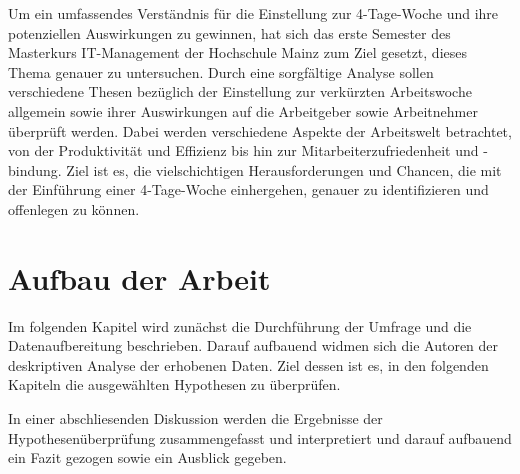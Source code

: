 Um ein umfassendes Verständnis für die Einstellung zur 4-Tage-Woche und ihre potenziellen Auswirkungen zu gewinnen, 
hat sich das erste Semester des Masterkurs IT-Management der Hochschule Mainz zum Ziel gesetzt, dieses Thema genauer zu untersuchen. 
Durch eine sorgfältige Analyse sollen verschiedene Thesen bezüglich der Einstellung zur verkürzten Arbeitswoche allgemein sowie 
ihrer Auswirkungen auf die Arbeitgeber sowie Arbeitnehmer überprüft werden. Dabei werden verschiedene Aspekte der Arbeitswelt 
betrachtet, von der Produktivität und Effizienz bis hin zur Mitarbeiterzufriedenheit und -bindung. Ziel ist es, die 
vielschichtigen Herausforderungen und Chancen, die mit der Einführung einer 4-Tage-Woche einhergehen, genauer zu identifizieren 
und offenlegen zu können.

\section{Aufbau der Arbeit}

Im folgenden Kapitel wird zunächst die Durchführung der Umfrage und die Datenaufbereitung beschrieben. Darauf aufbauend widmen sich die Autoren der deskriptiven Analyse der erhobenen Daten.
Ziel dessen ist es, in den folgenden Kapiteln die ausgewählten Hypothesen zu überprüfen.

In einer abschliesenden Diskussion werden die Ergebnisse der Hypothesenüberprüfung zusammengefasst und interpretiert und darauf aufbauend ein Fazit gezogen sowie ein Ausblick gegeben.